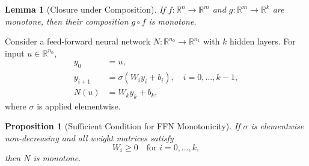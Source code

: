 \documentclass{article}
\theoremstyle{plain}
\newtheorem{proposition}[theorem]{Proposition}
\newtheorem{lemma}[theorem]{Lemma}
\theoremstyle{definition}
\newtheorem{definition}[theorem]{Definition}
\theoremstyle{remark}
\begin{document}


\begin{lemma}[Closure under Composition]
\label{lem:mono_comp}
If $f : \mathbb{R}^n \to \mathbb{R}^m$ and $g : \mathbb{R}^m \to \mathbb{R}^k$ are monotone, then their composition $g \circ f$ is monotone.
\end{lemma}


Consider a feed-forward neural network $N : \mathbb{R}^{n_0} \to \mathbb{R}^{n_k}$ with $k$ hidden layers. For input $u \in \mathbb{R}^{n_0}$,
\begin{align*}
y_0 &= u, \\
y_{i+1} &= \sigma(W_i y_i + b_i), \quad i = 0,\ldots,k-1, \\
N(u) &= W_k y_k + b_k,
\end{align*}
where $\sigma$ is applied elementwise.

\begin{proposition}[Sufficient Condition for FFN Monotonicity]
\label{prop:ffn_mono}
If $\sigma$ is elementwise non-decreasing and all weight matrices satisfy
\[
W_i \ge 0 \quad \text{for } i = 0,\ldots,k,
\]
then $N$ is monotone.
\end{proposition}


\end{document}
